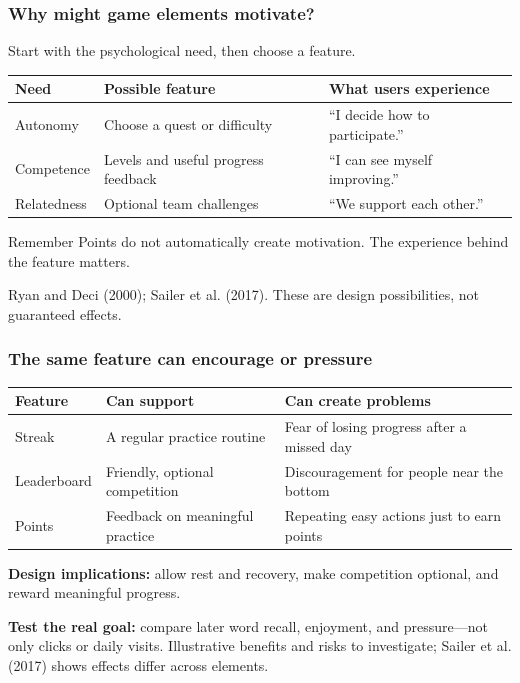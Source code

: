 \documentclass{beamer}
\begin{document}
\begin{frame}
\frametitle{Why might game elements motivate?}
\small
Start with the psychological need, then choose a feature.
\medskip
\renewcommand{\arraystretch}{1.35}
\begin{tabular}{@{}p{2cm}p{3.5cm}p{4cm}@{}}
\toprule
\textbf{Need} & \textbf{Possible feature} & \textbf{What users experience}\\
\midrule
Autonomy & Choose a quest or difficulty & ``I decide how to participate.''\\
Competence & Levels and useful progress feedback & ``I can see myself improving.''\\
Relatedness & Optional team challenges & ``We support each other.''\\
\bottomrule
\end{tabular}
\begin{block}{Remember}
Points do not automatically create motivation. The experience behind the feature matters.
\end{block}
{\tiny Ryan and Deci (2000); Sailer et al. (2017). These are design possibilities, not guaranteed effects.}
\end{frame}

\begin{frame}
\frametitle{The same feature can encourage or pressure}
\small
\renewcommand{\arraystretch}{1.3}
\begin{tabular}{@{}p{1.7cm}p{3.9cm}p{3.9cm}@{}}
\toprule
\textbf{Feature} & \textbf{Can support} & \textbf{Can create problems}\\
\midrule
Streak & A regular practice routine & Fear of losing progress after a missed day\\
Leaderboard & Friendly, optional competition & Discouragement for people near the bottom\\
Points & Feedback on meaningful practice & Repeating easy actions just to earn points\\
\bottomrule
\end{tabular}
\medskip
\textbf{Design implications:} allow rest and recovery, make competition optional, and reward meaningful progress.
\medskip

\textbf{Test the real goal:} compare later word recall, enjoyment, and pressure---not only clicks or daily visits.
\vfill
{\tiny Illustrative benefits and risks to investigate; Sailer et al. (2017) shows effects differ across elements.}
\end{frame}
\end{document}
